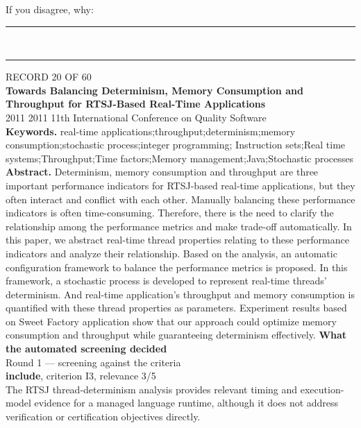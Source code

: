 \documentclass[11pt,a4paper]{article}
\begin{document}
{\footnotesize\color{soft}If you disagree, why:}\\[1mm]
\color{rule}\rule{\linewidth}{0.3pt}\\[3mm]\rule{\linewidth}{0.3pt}\color{black}
\clearpage
{\color{soft}\footnotesize RECORD 20 OF 60}\\[1mm]
{\large\bfseries Towards Balancing Determinism, Memory Consumption and Throughput for RTSJ-Based Real-Time Applications}\\[1.5mm]
{\color{soft}\small 2011 \textperiodcentered{} 2011 11th International Conference on Quality Software}\\[2mm]
{\small\textbf{Keywords.} real-time applications;throughput;determinism;memory consumption;stochastic process;integer programming; Instruction sets;Real time systems;Throughput;Time factors;Memory management;Java;Stochastic processes}\\[2mm]
{\small\textbf{Abstract.} Determinism, memory consumption and throughput are three important performance indicators for RTSJ-based real-time applications, but they often interact and conflict with each other. Manually balancing these performance indicators is often time-consuming. Therefore, there is the need to clarify the relationship among the performance metrics and make trade-off automatically. In this paper, we abstract real-time thread properties relating to these performance indicators and analyze their relationship. Based on the analysis, an automatic configuration framework to balance the performance metrics is proposed. In this framework, a stochastic process is developed to represent real-time threads' determinism. And real-time application's throughput and memory consumption is quantified with these thread properties as parameters. Experiment results based on Sweet Factory application show that our approach could optimize memory consumption and throughput while guaranteeing determinism effectively.}
\vspace{3mm}
\vspace{2.5mm}
{\small\textbf{What the automated screening decided}}\\[2mm]
{\footnotesize\color{soft}Round 1 --- screening against the criteria}\\[0.5mm]
{\small\textbf{include}, criterion I3, relevance 3/5}\\[0.5mm]
{\small The RTSJ thread-determinism analysis provides relevant timing and execution-model evidence for a managed language runtime, although it does not address verification or certification objectives directly.}\\[2.5mm]
\end{document}

